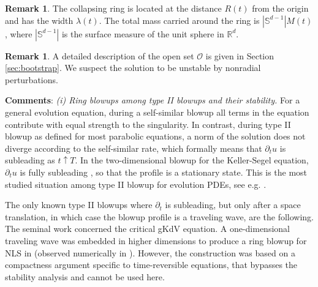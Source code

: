 \documentclass[11pt]{aims}
\theoremstyle{definition}
\newtheorem{remark}[theorem]{Remark}
\newcommand{\Oc}{\mathcal{O}}
\newcommand{\pa}{\partial}
\numberwithin{equation}{section}
\begin{document}
\vspace*{0.1cm}

\begin{remark}
The collapsing ring is located at the distance $R(t)$ from the origin and has the width $\lambda (t)$. The total mass carried around the ring is $|\mathbb S^{d-1}|M(t)$, where $|\mathbb S^{d-1}|$ is the surface measure of the unit sphere in $\mathbb R^d$.
\end{remark}

\begin{remark} A detailed description of the open set $\Oc$ is given in Section \ref{sec:bootstrap}. We suspect the solution to be unstable by nonradial perturbations.
 \end{remark}


\noindent \textbf{Comments}: 
\noindent \emph{(i) Ring blowups among type II blowups and their stability.} For a general evolution equation, during a self-similar blowup all terms in the equation contribute with equal strength to the singularity. In contrast, during type II blowup as defined for most parabolic equations, a norm of the solution does not diverge according to the self-similar rate, which formally means that $\pa_t u$ is subleading as $t\uparrow T$. In the two-dimensional blowup for the Keller-Segel equation, $\pa_t u $ is fully subleading \cite{HVma96,RSma14,CGNNcpam21}, so that the profile is a stationary state. This is the most studied situation among type II blowup for evolution PDEs, see e.g. \cite{KST,RaRo,RoSt,DDW}.

The only known type II blowups where $\pa_t$ is subleading, but only after a space translation, in which case the blowup profile is a traveling wave, are the following. The seminal work \cite{MaMe} concerned the critical gKdV equation. A one-dimensional traveling wave was embedded in higher dimensions to produce a ring blowup for NLS in \cite{MRSduke14} (observed numerically in \cite{FGWphys05,FGWphys07}). However, the construction was based on a compactness argument specific to time-reversible equations, that bypasses the stability analysis and cannot be used here.
\end{document}

